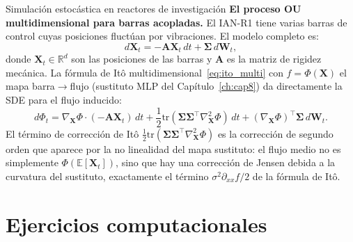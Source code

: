 \begin{estrella}{Simulación estocástica en reactores de investigación}
\textbf{El proceso OU multidimensional para barras acopladas.}
El IAN-R1 tiene varias barras de control cuyas posiciones fluctúan por
vibraciones. El modelo completo es:
\[
  d\bm{X}_t = -\bm{A}\bm{X}_t\,dt + \bm{\Sigma}\,d\bm{W}_t,
\]
donde $\bm{X}_t \in \mathbb{R}^d$ son las posiciones de las barras y $\bm{A}$
es la matriz de rigidez mecánica. La fórmula de Itô multidimensional~\eqref{eq:ito_multi}
con $f = \Phi(\bm{X})$ el mapa barra$\to$flujo (sustituto MLP del Capítulo~\ref{ch:cap8})
da directamente la SDE para el flujo inducido:
\[
  d\Phi_t = \nabla_{\bm{X}}\Phi\cdot(-\bm{A}\bm{X}_t)\,dt
  + \frac{1}{2}\mathrm{tr}(\bm{\Sigma}\bm{\Sigma}^\top\nabla^2_{\bm{X}}\Phi)\,dt
  + (\nabla_{\bm{X}}\Phi)^\top\bm{\Sigma}\,d\bm{W}_t.
\]
El término de corrección de Itô $\frac{1}{2}\mathrm{tr}(\bm{\Sigma}\bm{\Sigma}^\top
\nabla^2_{\bm{X}}\Phi)$ es la corrección de segundo orden que aparece por la
no linealidad del mapa sustituto: el flujo medio no es simplemente
$\Phi(\mathbb{E}[\bm{X}_t])$, sino que hay una corrección de Jensen debida a
la curvatura del sustituto, exactamente el término $\sigma^2\partial_{xx}f/2$
de la fórmula de Itô.
\end{estrella}

\section*{Ejercicios computacionales}

